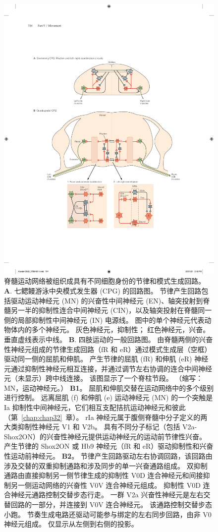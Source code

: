 \begin{figure}[htbp]
	\centering
	\includegraphics[width=0.8\linewidth]{chap33/fig_33_7}
	\caption{脊髓运动网络被组织成具有不同细胞身份的节律和模式生成回路。
	\textbf{A}. 七鳃鳗游泳中央模式发生器 (CPG) 的回路图。
	节律产生回路包括驱动运动神经元 (MN) 的兴奋性中间神经元 (EN)、轴突投射到脊髓另一半的抑制性连合中间神经元 (CIN)，以及轴突投射在脊髓同一侧的局部抑制性中间神经元 (IN) 电源线。
	图中的单个神经元代表动物体内的多个神经元。
	灰色神经元，抑制性； 红色神经元，兴奋。 垂直虚线表示中线\cite{grillner2006biological}。
	\textbf{B}. 四肢运动的一般回路图。
	由脊髓两侧的兴奋性神经元组成的节律生成回路（fR 和 eR）通过模式生成层（空框）驱动同一侧的屈肌和伸肌。
	产生节律的屈肌 (fR) 和伸肌 (eR) 神经元通过抑制性神经元相互连接，并通过调节左右协调的连合中间神经元（未显示）跨中线连接。
	该图显示了一个脊柱节段。 （缩写：MN，运动神经元。）\cite{kiehn2016decoding}
	\textbf{B1}。 屈肌和伸肌交替在运动网络中的多个级别进行控制。
	远离屈肌 (f) 和伸肌 (e) 运动神经元 (MN) 的一个突触是 Ia 抑制性中间神经元，它们相互支配拮抗运动神经元和彼此（第~\ref{chap:chap32}~章）。
	rIa 神经元属于腹侧脊髓中分子定义的两大类抑制性神经元 V1 和 V2b。
	具有不同分子标记（包括 V2a-Shox2ON）的兴奋性神经元提供运动神经元的运动前节律性兴奋。
	产生节律的 Shox2ON 或 Hb9 神经元（fR 和 eR）驱动抑制性和兴奋性运动前神经元。\cite{kiehn2016decoding}
	\textbf{B2}。 节律产生回路驱动左右协调回路，该回路由涉及交替的双重抑制通路和涉及同步的单一兴奋通路组成。
	双抑制通路由直接抑制另一侧节律生成的抑制性 V0D 连合神经元和间接抑制另一侧运动网络的兴奋性 V0V 连合神经元组成。
	抑制性 V0D 连合神经元通路控制交替步态行走。
	一群 V2a 兴奋性神经元是左右交替回路的一部分，并连接到 V0V 连合神经元。
	该通路控制交替步态小跑。
	节奏生成电路还驱动可能参与绑定的左右同步回路，由非 V0 神经元组成。
	仅显示从左侧到右侧的投影\cite{kiehn2016decoding}。}
	\label{fig:33_7}
\end{figure}


